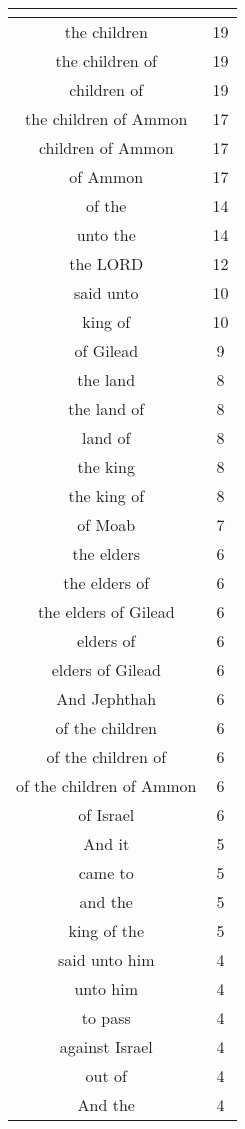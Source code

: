 \begin{center}
\begin{longtable}{|c|c|}
\hline \multicolumn{2}{c}{{ }} \\ \hline
\endfoot 
the children & 19\\ \hline 
the children of & 19\\ \hline 
children of & 19\\ \hline 
the children of Ammon & 17\\ \hline 
children of Ammon & 17\\ \hline 
of Ammon & 17\\ \hline 
of the & 14\\ \hline 
unto the & 14\\ \hline 
the LORD & 12\\ \hline 
said unto & 10\\ \hline 
king of & 10\\ \hline 
of Gilead & 9\\ \hline 
the land & 8\\ \hline 
the land of & 8\\ \hline 
land of & 8\\ \hline 
the king & 8\\ \hline 
the king of & 8\\ \hline 
of Moab & 7\\ \hline 
the elders & 6\\ \hline 
the elders of & 6\\ \hline 
the elders of Gilead & 6\\ \hline 
elders of & 6\\ \hline 
elders of Gilead & 6\\ \hline 
And Jephthah & 6\\ \hline 
of the children & 6\\ \hline 
of the children of & 6\\ \hline 
of the children of Ammon & 6\\ \hline 
of Israel & 6\\ \hline 
And it & 5\\ \hline 
came to & 5\\ \hline 
and the & 5\\ \hline 
king of the & 5\\ \hline 
said unto him & 4\\ \hline 
unto him & 4\\ \hline 
to pass & 4\\ \hline 
against Israel & 4\\ \hline 
out of & 4\\ \hline 
And the & 4\\ \hline 

\end{longtable}
\end{center}
